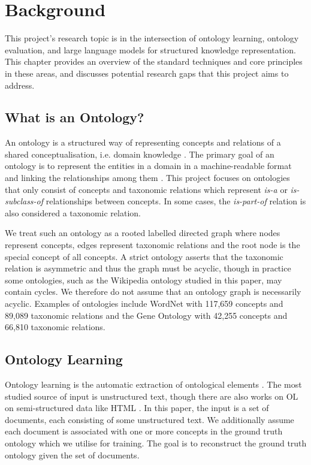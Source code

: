 \chapter{Background}

This project's research topic is in the intersection of ontology learning, ontology evaluation, and large language models for structured knowledge representation. This chapter provides an overview of the standard techniques and core principles in these areas, and discusses potential research gaps that this project aims to address.

\section{What is an Ontology?}

An ontology is a structured way of representing concepts and relations of a shared conceptualisation, i.e. domain knowledge \cite{gruber1995toward,gruber1993translation}. The primary goal of an ontology is to represent the entities in a domain in a machine-readable format and linking the relationships among them \cite{national2022ontologies}. This project focuses on ontologies that only consist of concepts and taxonomic relations which represent \emph{is-a} or \emph{is-subclass-of} relationships between concepts. In some cases, the \emph{is-part-of} relation is also considered a taxonomic relation.

We treat such an ontology as a rooted labelled directed graph where nodes represent concepts, edges represent taxonomic relations and the root node is the special concept of all concepts. A strict ontology asserts that the taxonomic relation is asymmetric and thus the graph must be acyclic, though in practice some ontologies, such as the Wikipedia ontology studied in this paper, may contain cycles. We therefore do not assume that an ontology graph is necessarily acyclic. Examples of ontologies include WordNet \cite{miller1995wordnet} with 117,659 concepts and 89,089 taxonomic relations and the Gene Ontology \cite{ashburner2000gene} with 42,255 concepts and 66,810 taxonomic relations.

\section{Ontology Learning}

Ontology learning is the automatic extraction of ontological elements \cite{hazman2011survey}. The most studied source of input is unstructured text, though there are also works on OL on semi-structured data like HTML \cite{karoui2004ontology}. In this paper, the input is a set of documents, each consisting of some unstructured text. We additionally assume each document is associated with one or more concepts in the ground truth ontology which we utilise for training. The goal is to reconstruct the ground truth ontology given the set of documents.

